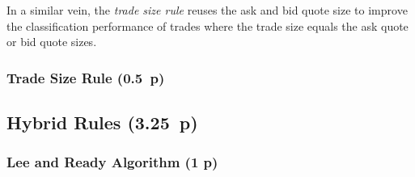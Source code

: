 In a similar vein, the \textit{trade size rule} reuses the ask and bid quote size to improve the classification performance of trades where the trade size equals the ask quote or bid quote sizes.

\subsubsection{Trade Size Rule (0.5~p)}\label{trade-size-rule}

\begin{algorithm}

  \caption{$\operatorname{\mathtt{tradesize}}(t_i, a_i, b_i)$ \label{alg:tradesize-rule}}


  \BlankLine %

\end{algorithm}


\subsection{Hybrid Rules (3.25~p)}\label{hybrid-rules}

\subsubsection{Lee and Ready Algorithm (1 p)}\label{lee-and-ready-algorithm}

